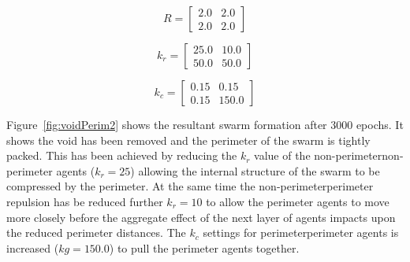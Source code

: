 \documentclass[12pt,a4paper]{IEEEtran}
\newcommand{\kc}{\mathit{k_{c}}}
\newcommand{\kr}{\mathit{k_{r}}}
\newcommand{\rb}{\mathit{R}}
\begin{document}
\begin{equation}\label{eq:voidPerim1}
	\rb = 
	\begin{bmatrix}
	2.0 & 2.0\\
	2.0 & 2.0
	\end{bmatrix}
\end{equation}
	
\begin{equation}\label{eq:voidPerim2}
	\kr = 
	\begin{bmatrix}
	25.0 & 10.0\\
	50.0 & 50.0
	\end{bmatrix}
\end{equation}

\begin{equation}\label{eq:voidPerim3}
	\kc = 
	\begin{bmatrix}
	0.15 & 0.15\\
	0.15 & 150.0 
	\end{bmatrix}
\end{equation}

Figure~\ref{fig:voidPerim2} shows the resultant swarm formation after 3000 epochs. It shows the void has been removed and the perimeter of the swarm is tightly packed. This has been achieved by reducing the $\kr$ value of the non-perimeter\textrightarrow non-perimeter agents ($\kr=25$) allowing the internal structure of the swarm to be compressed by the perimeter. At the same time the non-perimeter\textrightarrow perimeter repulsion has be reduced further $\kr=10$ to allow the perimeter agents to move more closely before the aggregate effect of the next layer of agents impacts upon the reduced perimeter distances. The $\kc$ settings for perimeter\textrightarrow perimeter agents is increased ($kg=150.0$) to pull the perimeter agents together.
\end{document}
